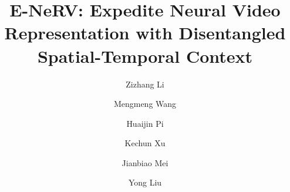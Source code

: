 \documentclass[runningheads]{llncs}
\begin{document}
\pagestyle{headings}
\mainmatter
\def\ECCVSubNumber{5463}  

\title{E-NeRV: Expedite Neural Video Representation with Disentangled Spatial-Temporal Context} 



\author{Zizhang Li \and Mengmeng Wang \and Huaijin Pi \and Kechun Xu \and Jianbiao Mei \and Yong Liu}
\maketitle
\let\thefootnote\relax{}

\newcommand{\netname}{E-NeRV }

\newcommand{\ba}{\mathbf{a}}\newcommand{\bA}{\mathbf{A}}
\newcommand{\bb}{\mathbf{b}}\newcommand{\bB}{\mathbf{B}}
\newcommand{\bc}{\mathbf{c}}\newcommand{\bC}{\mathbf{C}}
\newcommand{\bd}{\mathbf{d}}\newcommand{\bD}{\mathbf{D}}
\newcommand{\be}{\mathbf{e}}\newcommand{\bE}{\mathbf{E}}
\newcommand{\bff}{\mathbf{f}}\newcommand{\bF}{\mathbf{F}} \newcommand{\bg}{\mathbf{g}}\newcommand{\bG}{\mathbf{G}}
\newcommand{\bh}{\mathbf{h}}\newcommand{\bH}{\mathbf{H}}
\newcommand{\bi}{\mathbf{i}}\newcommand{\bI}{\mathbf{I}}
\newcommand{\bj}{\mathbf{j}}\newcommand{\bJ}{\mathbf{J}}
\newcommand{\bk}{\mathbf{k}}\newcommand{\bK}{\mathbf{K}}
\newcommand{\bl}{\mathbf{l}}\newcommand{\bL}{\mathbf{L}}
\newcommand{\bm}{\mathbf{m}}\newcommand{\bM}{\mathbf{M}}
\newcommand{\bn}{\mathbf{n}}\newcommand{\bN}{\mathbf{N}}
\newcommand{\bo}{\mathbf{o}}\newcommand{\bO}{\mathbf{O}}
\newcommand{\bp}{\mathbf{p}}\newcommand{\bP}{\mathbf{P}}
\newcommand{\bq}{\mathbf{q}}\newcommand{\bQ}{\mathbf{Q}}
\newcommand{\br}{\mathbf{r}}\newcommand{\bR}{\mathbf{R}}
\newcommand{\bs}{\mathbf{s}}\newcommand{\bS}{\mathbf{S}}
\newcommand{\bt}{\mathbf{t}}\newcommand{\bT}{\mathbf{T}}
\newcommand{\bu}{\mathbf{u}}\newcommand{\bU}{\mathbf{U}}
\newcommand{\bv}{\mathbf{v}}\newcommand{\bV}{\mathbf{V}}
\newcommand{\bw}{\mathbf{w}}\newcommand{\bW}{\mathbf{W}}
\newcommand{\bx}{\mathbf{x}}\newcommand{\bX}{\mathbf{X}}
\newcommand{\by}{\mathbf{y}}\newcommand{\bY}{\mathbf{Y}}
\newcommand{\bz}{\mathbf{z}}\newcommand{\bZ}{\mathbf{Z}}
\end{document}
